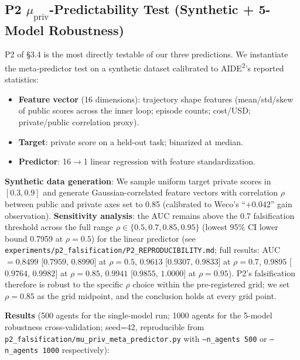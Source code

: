 \subsection{P2 $\mu_{\text{priv}}$-Predictability Test (Synthetic + 5-Model Robustness)}

P2 of \S3.4 is the most directly testable of our three predictions. We instantiate the meta-predictor test on a synthetic dataset calibrated to AIDE\textsuperscript{2}'s reported statistics:

\begin{itemize}
    \item \textbf{Feature vector} (16 dimensions): trajectory shape features (mean/std/skew of public scores across the inner loop; episode counts; cost/USD; private/public correlation proxy).
    \item \textbf{Target}: private score on a held-out task; binarized at median.
    \item \textbf{Predictor}: 16$\to$1 linear regression with feature standardization.
\end{itemize}

\textbf{Synthetic data generation}: We sample uniform target private scores in $[0.3, 0.9]$ and generate Gaussian-correlated feature vectors with correlation $\rho$ between public and private axes set to 0.85 (calibrated to Weco's ``$+0.042$'' gain observation). \textbf{Sensitivity analysis}: the AUC remains above the 0.7 falsification threshold across the full range $\rho \in \{0.5, 0.7, 0.85, 0.95\}$ (lowest 95\% CI lower bound 0.7959 at $\rho=0.5$) for the linear predictor (see \texttt{experiments/p2\_falsification/P2\_REPRODUCIBILITY.md}; full results: AUC $= 0.8499$ [$0.7959$, $0.8990$] at $\rho=0.5$, $0.9613$ [$0.9307$, $0.9833$] at $\rho=0.7$, $0.9895$ [$0.9764$, $0.9982$] at $\rho=0.85$, $0.9941$ [$0.9855$, $1.0000$] at $\rho=0.95$). P2's falsification therefore is robust to the specific $\rho$ choice within the pre-registered grid; we set $\rho=0.85$ as the grid midpoint, and the conclusion holds at every grid point.

\textbf{Results} (500 agents for the single-model run; 1000 agents for the 5-model robustness cross-validation; seed=42, reproducible from \texttt{p2\_falsification/mu\_priv\_meta\_predictor.py} with \texttt{--n\_agents 500} or \texttt{--n\_agents 1000} respectively):

